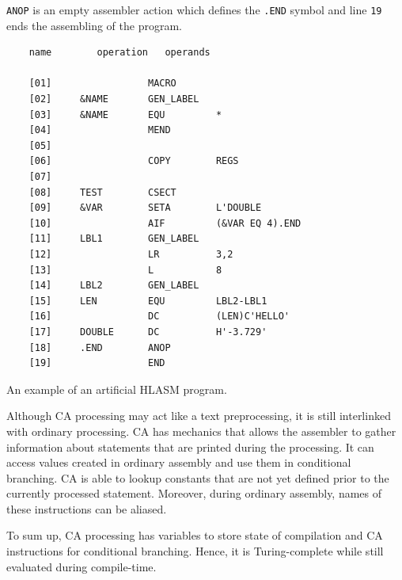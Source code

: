 \verb|ANOP| is an empty assembler action which defines the \verb|.END| symbol and line \verb|19| ends the assembling of the program. 

\begin{listing}[t]
	\begin{verbatim}
	name        operation   operands
	
	[01]                 MACRO                   
	[02]     &NAME       GEN_LABEL
	[03]     &NAME       EQU         *
	[04]                 MEND
	[05]             
	[06]                 COPY        REGS
	[07]             
	[08]     TEST        CSECT
	[09]     &VAR        SETA        L'DOUBLE
	[10]                 AIF         (&VAR EQ 4).END
	[11]     LBL1        GEN_LABEL
	[12]                 LR          3,2
	[13]                 L           8
	[14]     LBL2        GEN_LABEL
	[15]     LEN         EQU         LBL2-LBL1
	[16]                 DC          (LEN)C'HELLO'
	[17]     DOUBLE      DC          H'-3.729'
	[18]     .END        ANOP
	[19]                 END
	\end{verbatim} 
	\caption{An example of an artificial HLASM program.}
	\label{lst:example}
\end{listing}

\vspace{5mm}

Although CA processing may act like a text preprocessing, it is still interlinked with ordinary processing. CA has mechanics that allows the assembler to gather information about statements that are printed during the processing. It can access values created in ordinary assembly and use them in conditional branching. CA is able to lookup constants that are not yet defined prior to the currently processed statement. Moreover, during ordinary assembly, names of these instructions can be aliased.

To sum up, CA processing has variables to store state of compilation and CA instructions for conditional branching. Hence, it is Turing-complete while still evaluated during compile-time.


